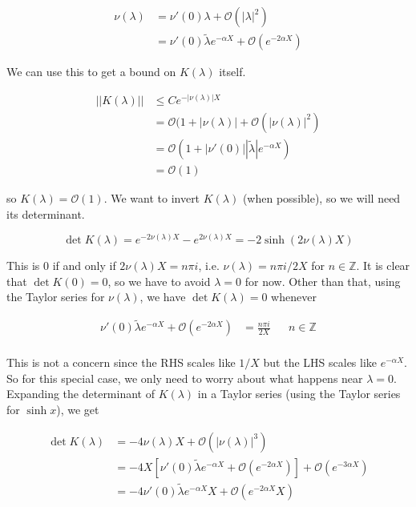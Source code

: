 \documentclass[12pt]{article}
\def\Z{{\mathbb Z}}
\begin{document}
\begin{align*}
\nu(\lambda) &= \nu'(0)\lambda + \mathcal{O}(|\lambda|^2) \\
&= \nu'(0)\tilde{\lambda}e^{-\alpha X} + \mathcal{O}(e^{-2 \alpha X})
\end{align*}

We can use this to get a bound on $K(\lambda)$ itself.

\begin{align*}
||K(\lambda)|| &\leq C e^{-|\nu(\lambda)|X} \\
 &= \mathcal{O} (1 + |\nu(\lambda)| + \mathcal{O}(|\nu(\lambda)|^2) \\
&= \mathcal{O}( 1 + |\nu'(0)| |\tilde{\lambda} | e^{-\alpha X} ) \\
&= \mathcal{O}(1)
\end{align*}

so $K(\lambda) = \mathcal{O}(1)$. We want to invert $K(\lambda)$ (when possible), so we will need its determinant.

\[
\det K(\lambda) = e^{-2 \nu(\lambda)X} - e^{2 \nu(\lambda)X} = -2 \sinh(2 \nu(\lambda) X)
\]

This is 0 if and only if $2 \nu(\lambda)X = n \pi i$, i.e. $\nu(\lambda) = n \pi i / 2X$ for $n \in \Z$. It is clear that $\det K(0) = 0$, so we have to avoid $\lambda = 0$ for now. Other than that, using the Taylor series for $\nu(\lambda)$, we have $\det K(\lambda) = 0$ whenever

\begin{align*}
\nu'(0)\tilde{\lambda}e^{-\alpha X} + \mathcal{O}(e^{-2 \alpha X}) &= \frac{n \pi i }{2X} && n \in \Z \\
\end{align*}

This is not a concern since the RHS scales like $1/X$ but the LHS scales like $e^{-\alpha X}$. So for this special case, we only need to worry about what happens near $\lambda = 0$. Expanding the determinant of $K(\lambda)$ in a Taylor series (using the Taylor series for $\sinh x$), we get

\begin{align*}
\det K(\lambda) &= -4 \nu(\lambda) X + \mathcal{O}(|\nu(\lambda)|^3) \\
&= -4 X [ \nu'(0)\tilde{\lambda}e^{-\alpha X} + \mathcal{O}(e^{-2 \alpha X}) ] + \mathcal{O}(e^{-3 \alpha X}) \\
&= -4 \nu'(0)\tilde{\lambda}e^{-\alpha X}X + \mathcal{O}(e^{-2 \alpha X}X) 
\end{align*}
\end{document}
